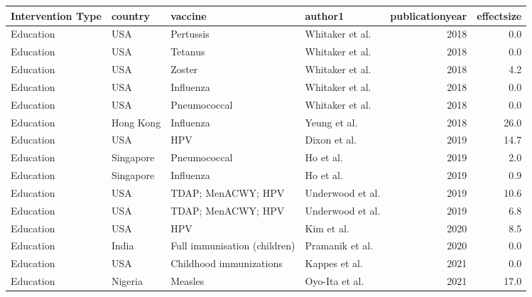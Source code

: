 
\begin{tabular}{llllrr}
\toprule
Intervention Type & country & vaccine & author1 & publicationyear & effectsize\\
\midrule
Education & USA & Pertussis & Whitaker et al. & 2018 & 0.0\\
Education & USA & Tetanus & Whitaker et al. & 2018 & 0.0\\
Education & USA & Zoster & Whitaker et al. & 2018 & 4.2\\
Education & USA & Influenza & Whitaker et al. & 2018 & 0.0\\
Education & USA & Pneumococcal & Whitaker et al. & 2018 & 0.0\\
\addlinespace
Education & Hong Kong & Influenza & Yeung et al. & 2018 & 26.0\\
Education & USA & HPV & Dixon et al. & 2019 & 14.7\\
Education & Singapore & Pneumococcal & Ho et al. & 2019 & 2.0\\
Education & Singapore & Influenza & Ho et al. & 2019 & 0.9\\
Education & USA & TDAP; MenACWY; HPV & Underwood et al. & 2019 & 10.6\\
\addlinespace
Education & USA & TDAP; MenACWY; HPV & Underwood et al. & 2019 & 6.8\\
Education & USA & HPV & Kim et al. & 2020 & 8.5\\
Education & India & Full immunisation (children) & Pramanik et al. & 2020 & 0.0\\
Education & USA & Childhood immunizations & Kappes et al. & 2021 & 0.0\\
Education & Nigeria & Measles & Oyo-Ita et al. & 2021 & 17.0\\
\bottomrule
\end{tabular}
